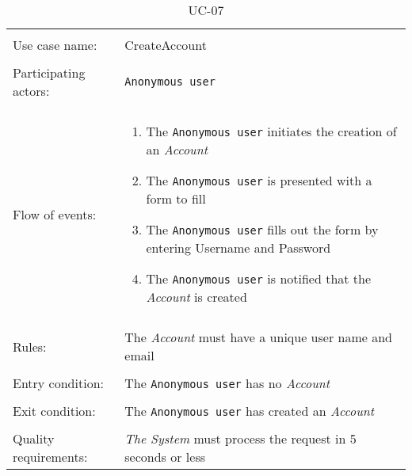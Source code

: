 \noindent
\begin{table}[h!]
\caption{UC-07}
\label{UC-07}
\centering
\begin{tabular}{ l p{8cm} } 
\hline       
\\                
Use case name:  & CreateAccount   \\   \hline  \\              
Participating actors:  & \texttt{Anonymous user} \\   \hline \\
Flow of events: & \begin{enumerate}
\item{The \texttt{Anonymous user} initiates the creation of an \textit{Account}}
\item{The \texttt{Anonymous user} is presented with a form to fill}
\item{The \texttt{Anonymous user} fills out the form by entering Username and Password}
\item{The \texttt{Anonymous user} is notified that the \textit{Account} is created}
\end{enumerate}
\\   \hline \\
Rules: & The \textit{Account} must have a unique user name and email \\ \hline \\
Entry condition: & The \texttt{Anonymous user} has no \textit{Account} \\ \hline \\
Exit condition: & The \texttt{Anonymous user} has created an \textit{Account} \\ \hline \\
Quality requirements: & \textit{The System} must process the request in 5 seconds or less \\  \hline      
\end{tabular} \\
\end{table}

